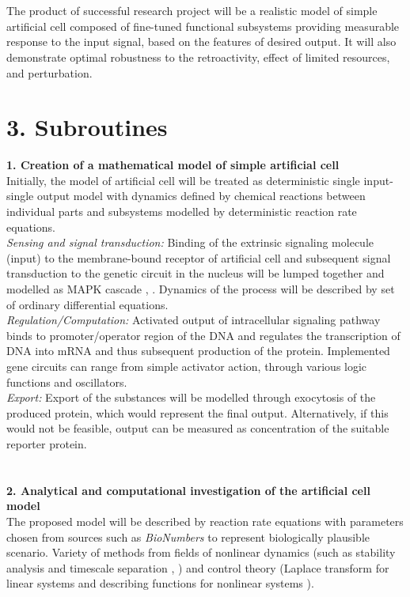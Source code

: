 \documentclass{article}
\begin{document}
\\
\\
The product of successful research project will be a realistic model of simple artificial cell composed of fine-tuned functional subsystems providing measurable response to the input signal, based on the features of desired output. It will also demonstrate optimal robustness to the retroactivity, effect of limited resources, and perturbation.
\pagebreak
	\section*{3. Subroutines}
\textbf{1. Creation of a mathematical model of simple artificial cell}\\
Initially, the model of artificial cell will be treated as deterministic single input-single output model with dynamics defined by chemical reactions between individual parts and subsystems modelled by deterministic reaction rate equations.\\
\textit{Sensing and signal transduction:} Binding of the extrinsic signaling molecule (input) to the membrane-bound receptor of artificial cell and subsequent signal transduction to the genetic circuit in the nucleus will be lumped together and modelled as MAPK cascade \cite{biofeedback}, \cite{alberts}. Dynamics of the process will be described by set of ordinary differential equations.\\
\textit{Regulation/Computation:} Activated output of intracellular signaling pathway binds to promoter/operator region of the DNA and regulates the transcription of DNA into mRNA and thus subsequent production of the protein. Implemented gene circuits can range from simple activator action, through various logic functions and oscillators.\\
\textit{Export:} Export of the substances will be modelled through exocytosis of the produced protein, which would represent the final output. Alternatively, if this would not be feasible, output can be measured as concentration of the suitable reporter protein.\\ \\ \\
\textbf{2. Analytical and computational investigation of the artificial cell model}\\ 
The proposed model will be described by reaction rate equations with parameters chosen from sources such as \textit{BioNumbers} \cite{bionumbers} to represent biologically plausible scenario. Variety of methods from fields of nonlinear dynamics (such as stability analysis and timescale separation \cite{biofeedback}, \cite{strogatz}) and control theory (Laplace transform for linear systems and describing functions for nonlinear systems \cite{slotine}).
\end{document}
